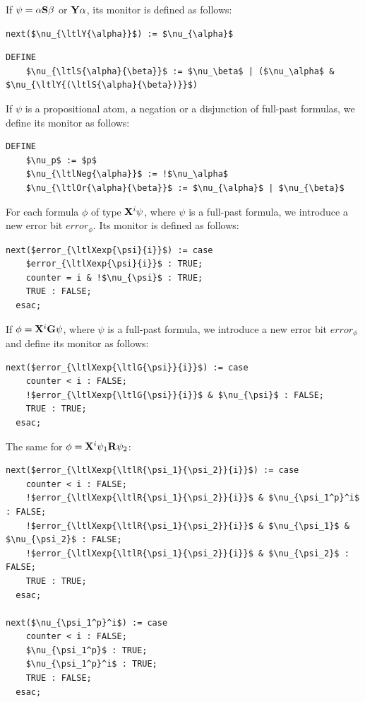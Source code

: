 If $\psi = \ltlS{\alpha}{\beta}$ or $\ltlY{\alpha}$, its monitor is defined as follows:
\begin{lstlisting}[language=smv,mathescape=true, caption=$\ebrltl$: yesterdat monitor]
next($\nu_{\ltlY{\alpha}}$) := $\nu_{\alpha}$
\end{lstlisting}
\begin{lstlisting}[language=smv,mathescape=true, caption=$\ebrltl$: since monitor]
DEFINE
    $\nu_{\ltlS{\alpha}{\beta}}$ := $\nu_\beta$ | ($\nu_\alpha$ & $\nu_{\ltlY{(\ltlS{\alpha}{\beta})}}$)
\end{lstlisting}

If $\psi$ is a propositional atom, a negation or a disjunction of full-past formulas, we define its monitor as follows:
\begin{lstlisting}[language=smv,mathescape=true, caption={$\ebrltl$: propositional atom, negation and disjunction monitors}]
DEFINE
    $\nu_p$ := $p$
    $\nu_{\ltlNeg{\alpha}}$ := !$\nu_\alpha$
    $\nu_{\ltlOr{\alpha}{\beta}}$ := $\nu_{\alpha}$ | $\nu_{\beta}$
\end{lstlisting}

For each formula $\phi$ of type $\ltlXexp{\psi}{i}$, where $\psi$ is a full-past formula, we introduce a new error bit $error_\phi$. Its monitor is defined as follows:
\begin{lstlisting}[language=smv,mathescape=true, caption=$\ebrltl$: next of proposition monitor]
next($error_{\ltlXexp{\psi}{i}}$) := case
    $error_{\ltlXexp{\psi}{i}}$ : TRUE;
    counter = i & !$\nu_{\psi}$ : TRUE;
    TRUE : FALSE;
  esac;
\end{lstlisting}

If $\phi = \ltlXexp{\ltlG{\psi}}{i}$, where $\psi$ is a full-past formula, we introduce a new error bit $error_\phi$ and define its monitor as follows:
\begin{lstlisting}[language=smv, mathescape=true, caption=$\ebrltl$: next of globally monitor]
next($error_{\ltlXexp{\ltlG{\psi}}{i}}$) := case
    counter < i : FALSE;
    !$error_{\ltlXexp{\ltlG{\psi}}{i}}$ & $\nu_{\psi}$ : FALSE;
    TRUE : TRUE;
  esac;
\end{lstlisting}

The same for $\phi = \ltlXexp{\ltlR{\psi_1}{\psi_2}}{i}$:
\begin{lstlisting}[language=smv, mathescape=true, caption=$\ebrltl$: next of release monitor]
next($error_{\ltlXexp{\ltlR{\psi_1}{\psi_2}}{i}}$) := case
    counter < i : FALSE;
    !$error_{\ltlXexp{\ltlR{\psi_1}{\psi_2}}{i}}$ & $\nu_{\psi_1^p}^i$ : FALSE;
    !$error_{\ltlXexp{\ltlR{\psi_1}{\psi_2}}{i}}$ & $\nu_{\psi_1}$ & $\nu_{\psi_2}$ : FALSE;
    !$error_{\ltlXexp{\ltlR{\psi_1}{\psi_2}}{i}}$ & $\nu_{\psi_2}$ : FALSE;
    TRUE : TRUE;
  esac;

next($\nu_{\psi_1^p}^i$) := case
    counter < i : FALSE;
    $\nu_{\psi_1^p}$ : TRUE;
    $\nu_{\psi_1^p}^i$ : TRUE;
    TRUE : FALSE;
  esac;
\end{lstlisting}

